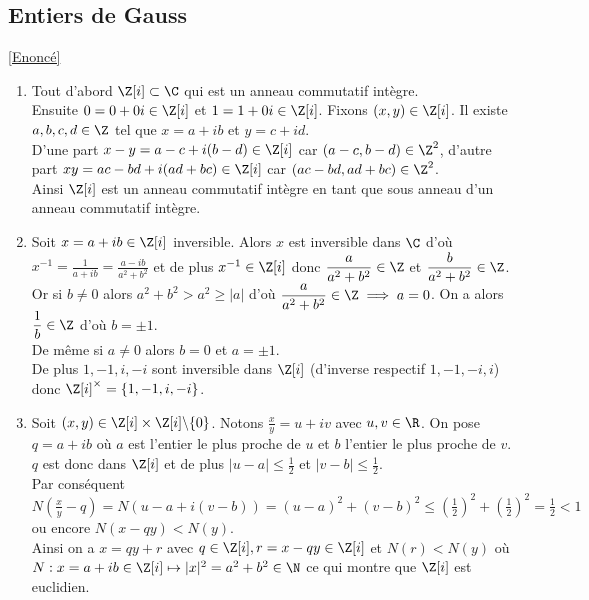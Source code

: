 \documentclass[8pt]{book}
\begin{document}
	\subsection{Entiers de Gauss }
	\label{Entiers de Gauss corrigé}
	\textcolor{blue}{\hyperref[Entiers de Gauss]{[Enoncé]}}\\
	\begin{enumerate}
		\item Tout d'abord $\Z[i]\subset \C$ qui est un anneau commutatif intègre.\\
		Ensuite $0=0+0i\in \Z[i]$ et $1=1+0i\in \Z[i]$. Fixons $(x,y)\in \Z[i]$. Il existe $a,b,c,d\in \Z$ tel que $x=a+ib$ et $y=c+id$.\\
		D'une part $x-y=a-c+i(b-d)\in \Z[i]$ car $(a-c,b-d)\in \Z^2$, d'autre part $xy=ac-bd+i(ad+bc)\in \Z[i]$ car $(ac-bd,ad+bc)\in \Z^2$.\\
		Ainsi $\Z[i]$ est un anneau commutatif intègre en tant que sous anneau d'un anneau commutatif intègre.
		\item Soit $x=a+ib\in \Z[i]$ inversible. Alors $x$ est inversible dans $\C$ d'où $x^{-1}=\displaystyle\frac{1}{a+ib}=\frac{a-ib}{a^2+b^2}$ et de plus $x^{-1}\in \Z[i]$ donc $\displaystyle\frac{a}{a^2+b^2}\in \Z$ et $\displaystyle\frac{b}{a^2+b^2}\in \Z$.\\
		Or si $b\ne 0$ alors $a^2+b^2>a^2\geq |a|$ d'où $\displaystyle\frac{a}{a^2+b^2}\in\Z\implies a=0$. On a alors $\displaystyle\frac{1}{b}\in \Z$ d'où $b=\pm1$.\\
		De même si $a\ne 0$ alors $b=0$ et $a=\pm 1$.\\
		De plus $1,-1,i,-i$ sont inversible dans $\Z[i]$ (d'inverse respectif $1,-1,-i,i$) donc $\Z[i]^\times=\{1,-1,i,-i\}$.
		\item Soit $(x,y)\in \Z[i]\times\Z[i]\backslash\{0\}$. Notons $\displaystyle\frac{x}{y}=u+iv$ avec $u,v\in \R$. On pose $q=a+ib$ où $a$ est l'entier le plus proche de $u$ et $b$ l'entier le plus proche de $v$. $q$ est donc dans $\Z[i]$ et de plus $|u-a|\leq \displaystyle\frac{1}{2}$ et $|v-b|\leq \displaystyle\frac{1}{2}$.\\
		Par conséquent $\displaystyle N\left(\frac{x}{y}-q\right)=N(u-a+i(v-b))=(u-a)^2+(v-b)^2\leq \displaystyle\left(\frac{1}{2}\right)^2+\left(\frac{1}{2}\right)^2=\frac{1}{2}<1$ ou encore $N(x-qy)<N(y)$.\\
		Ainsi on a $x=qy+r$ avec $q\in \Z[i], r=x-qy\in \Z[i]$ et $N(r)<N(y)$ où $N:x=a+ib\in \Z[i]\mapsto |x|^2=a^2+b^2\in \N$ ce qui montre que $\Z[i]$ est euclidien.\\

\end{enumerate}
\end{document}
